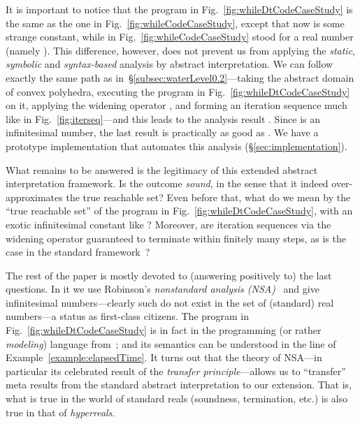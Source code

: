 \documentclass[envcountsect,orivec]{llncs} \pdfoutput=1
\theoremstyle{definition}
\begin{document}
It is important to notice that the program in
Fig.~\ref{fig:whileDtCodeCaseStudy} is the same as the one in
Fig.~\ref{fig:whileCodeCaseStudy}, except that now  is some strange
constant,
while  in Fig.~\ref{fig:whileCodeCaseStudy} stood for a real
number (namely ). This difference, however, does not prevent us
from applying the \emph{static}, \emph{symbolic} and \emph{syntax-based} analysis by abstract
interpretation. We can follow exactly the same path as 
in~\S{}\ref{subsec:waterLevel0.2}---taking the abstract domain of convex
polyhedra, executing the program in Fig.~\ref{fig:whileDtCodeCaseStudy}
on it, applying the widening operator , and forming an
iteration sequence much like in Fig.~\ref{fig:iterseq}---and this leads
 to the analysis result . Since 
is an infinitesimal number, the last result is practically as  good as
. We  have a prototype implementation that automates 
this analysis (\S{}\ref{sec:implementation}). 

What remains to be answered is the legitimacy of this extended abstract
interpretation framework. Is the outcome 
\emph{sound}, in the sense that it indeed over-approximates the true
reachable
set? Even before that, what do we mean by the ``true
reachable
set'' of the program in Fig.~\ref{fig:whileDtCodeCaseStudy}, 
with an exotic infinitesimal constant like ? Moreover,  are
iteration sequences via the widening operator  guaranteed to
terminate
within finitely many steps, as is the case in the standard
framework~\cite{Halbwachs1993, Halbwachs1997}?

The rest of the paper is mostly devoted to (answering positively to) the
last questions. In it we use Robinson's \emph{nonstandard analysis
(NSA)}~\cite{Robinson1966} and give  infinitesimal numbers---clearly
such do not exist in the set of (standard) real numbers---a status as first-class citizens. The program in
Fig.~\ref{fig:whileDtCodeCaseStudy} is in fact in the programming (or
rather \emph{modeling}) language  from~\cite{Suenaga2011,Hasuo2012};
and its semantics can be understood in the line of
Example~\ref{example:elapsedTime}. It turns out that the theory of
NSA---in particular its celebrated result of the \emph{transfer
principle}---allows us to ``transfer'' meta results from the standard
abstract interpretation to our extension. That is, what is true in the
world of standard reals (soundness, termination, etc.) is also true in 
that of \emph{hyperreals}. 
\end{document}
